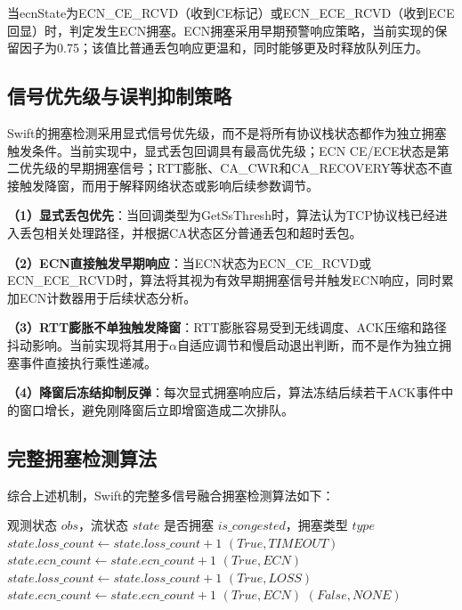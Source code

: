 当ecnState为ECN\_CE\_RCVD（收到CE标记）或ECN\_ECE\_RCVD（收到ECE回显）时，判定发生ECN拥塞。ECN拥塞采用早期预警响应策略，当前实现的保留因子为0.75；该值比普通丢包响应更温和，同时能够更及时释放队列压力。

\subsection{信号优先级与误判抑制策略}

Swift的拥塞检测采用显式信号优先级，而不是将所有协议栈状态都作为独立拥塞触发条件。当前实现中，显式丢包回调具有最高优先级；ECN CE/ECE状态是第二优先级的早期拥塞信号；RTT膨胀、CA\_CWR和CA\_RECOVERY等状态不直接触发降窗，而用于解释网络状态或影响后续参数调节。

\textbf{（1）显式丢包优先}：当回调类型为GetSsThresh时，算法认为TCP协议栈已经进入丢包相关处理路径，并根据CA状态区分普通丢包和超时丢包。

\textbf{（2）ECN直接触发早期响应}：当ECN状态为ECN\_CE\_RCVD或ECN\_ECE\_RCVD时，算法将其视为有效早期拥塞信号并触发ECN响应，同时累加ECN计数器用于后续状态分析。

\textbf{（3）RTT膨胀不单独触发降窗}：RTT膨胀容易受到无线调度、ACK压缩和路径抖动影响。当前实现将其用于$\alpha$自适应调节和慢启动退出判断，而不是作为独立拥塞事件直接执行乘性递减。

\textbf{（4）降窗后冻结抑制反弹}：每次显式拥塞响应后，算法冻结后续若干ACK事件中的窗口增长，避免刚降窗后立即增窗造成二次排队。

\subsection{完整拥塞检测算法}

综合上述机制，Swift的完整多信号融合拥塞检测算法如下：

\begin{algorithm}[htbp]
\caption{多信号融合拥塞检测算法}
\begin{algorithmic}[1]
\Require 观测状态 $obs$，流状态 $state$
\Ensure 是否拥塞 $is\_congested$，拥塞类型 $type$
\State {}
 
        \State $state.loss\_count \leftarrow state.loss\_count + 1$
        \State \Return $(True, TIMEOUT)$ 
    \EndIf
        \State $state.ecn\_count \leftarrow state.ecn\_count + 1$
        \State \Return $(True, ECN)$ 
    \EndIf
    \State $state.loss\_count \leftarrow state.loss\_count + 1$
    \State \Return $(True, LOSS)$ 
\EndIf
\State {}
    \State $state.ecn\_count \leftarrow state.ecn\_count + 1$
    \State \Return $(True, ECN)$
\EndIf
\State {}
\State \Return $(False, NONE)$
\end{algorithmic}
\end{algorithm}

